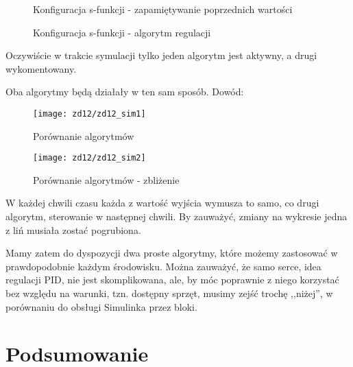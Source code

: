\documentclass[11 pt]{article}
\begin{document}
\newpage

\begin{figure}[h!]
	\centerline{
	}
	\caption{Konfiguracja s-funkcji - zapamiętywanie poprzednich wartości}
\end{figure}

\begin{figure}[h!]
	\centerline{
	}
	\caption{Konfiguracja s-funkcji - algorytm regulacji}
\end{figure}

Oczywiście w trakcie symulacji tylko jeden algorytm jest aktywny, a drugi wykomentowany.

Oba algorytmy będą działały w ten sam sposób. Dowód:

\begin{figure}[h!]
	\centerline{
		\texttt{[image: zd12/zd12\_sim1]}
	}
	\caption{Porównanie algorytmów}
\end{figure}

\newpage

\begin{figure}[h!]
	\centerline{
		\texttt{[image: zd12/zd12\_sim2]}
	}
	\caption{Porównanie algorytmów - zbliżenie}
\end{figure}

W każdej chwili czasu każda z wartość wyjścia wymusza to samo, co drugi algorytm, sterowanie w następnej chwili. By zauważyć, zmiany na wykresie jedna z liń musiała zostać pogrubiona.

Mamy zatem do dyspozycji dwa proste algorytmy, które możemy zastosować w prawdopodobnie każdym środowisku. Można zauważyć, że samo serce, idea regulacji PID, nie jest skomplikowana, ale, by móc poprawnie z niego korzystać bez względu na warunki, tzn. dostępny sprzęt, musimy zejść trochę ,,niżej'', w porównaniu do obsługi Simulinka przez bloki.

\newpage

\section*{Podsumowanie}
\end{document}
